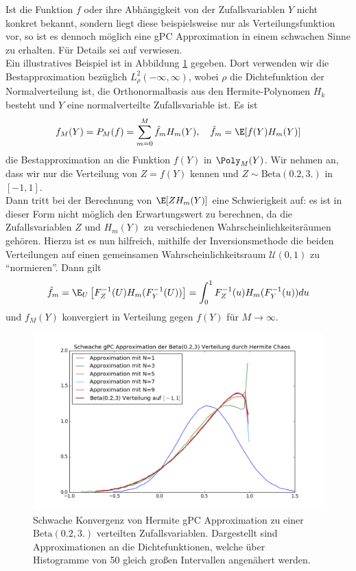 \begin{mathbem}
Ist die Funktion $f$ oder ihre Abhängigkeit von der Zufallsvariablen $Y$ nicht konkret bekannt, sondern liegt diese beispielsweise nur als Verteilungsfunktion vor, so ist es dennoch möglich eine gPC Approximation in einem schwachen Sinne zu erhalten. Für Details sei auf \autocite[Kapitel 5.1.2]{dongbinxiu2010} verwiesen.\\
Ein illustratives Beispiel ist in Abbildung \ref{fig:gpcweakconv} gegeben. Dort verwenden wir die Bestapproximation bezüglich $L_\rho^2(-\infty,\infty)$, wobei $\rho$ die Dichtefunktion der Normalverteilung ist, die Orthonormalbasis aus den Hermite-Polynomen $H_k$ besteht und $Y$ eine normalverteilte Zufallsvariable ist. Es ist
\[f_M(Y)=P_M(f)=\sum_{m=0}^M\hat{f}_mH_m(Y), \quad \hat{f}_m=\E[f(Y)H_m(Y)]\]
die Bestapproximation an die Funktion $f(Y)$ in $\Poly_M(Y)$. Wir nehmen an, dass wir nur die Verteilung von $Z=f(Y)$ kennen und $Z\sim\text{Beta}(0.2,3.)$ in $[-1,1]$.\\
Dann tritt bei der Berechnung von $\E[ZH_m(Y)]$ eine Schwierigkeit auf: es ist in dieser Form nicht möglich den Erwartungswert zu berechnen, da die Zufallsvariablen $Z$ und $H_m(Y)$ zu verschiedenen Wahrscheinlichkeitsräumen gehören. Hierzu ist es nun hilfreich, mithilfe der Inversionsmethode die beiden Verteilungen auf einen gemeinsamen Wahrscheinlichkeitsraum $\mathcal{U}(0,1)$ zu "`normieren"'. Dann gilt
\[\hat{f}_m=\E_U\left[F_Z^{-1}(U)H_m(F_Y^{-1}(U))\right]=\int_0^1F_Z^{-1}(u)H_m(F_Y^{-1}(u))du\]
und $f_M(Y)$ konvergiert in Verteilung gegen $f(Y)$ für $M\to\infty$.
\begin{figure}[!htb]
\includegraphics[width=\textwidth]{Figures/gpc_weak_convergence.png}
\caption{Schwache Konvergenz von Hermite gPC Approximation zu einer $\text{Beta}(0.2,3.)$ verteilten Zufallsvariablen. Dargestellt sind Approximationen an die Dichtefunktionen, welche über Histogramme von 50 gleich großen Intervallen angenähert werden.}
\label{fig:gpcweakconv}
\end{figure}
\end{mathbem}

